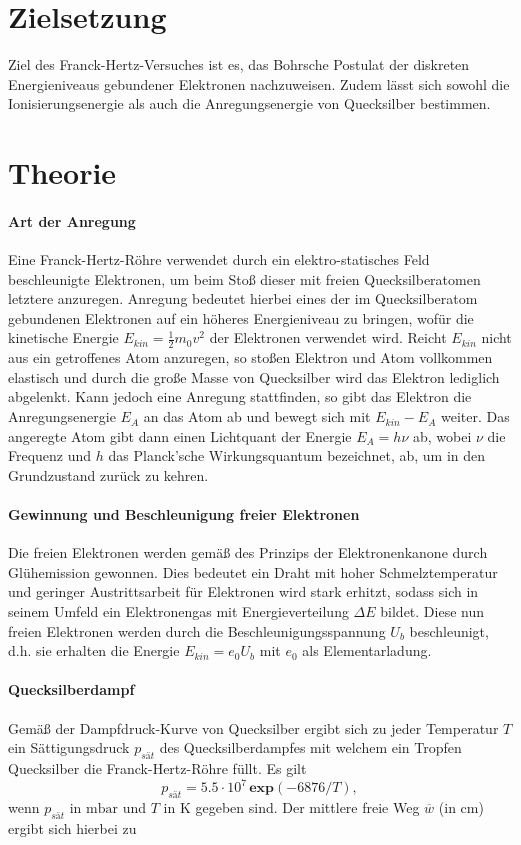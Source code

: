 \section{Zielsetzung}
\label{sec:Ziel}
Ziel des Franck-Hertz-Versuches ist es, das Bohrsche Postulat der diskreten Energieniveaus gebundener Elektronen nachzuweisen.
Zudem lässt sich sowohl die Ionisierungsenergie als auch die Anregungsenergie von Quecksilber bestimmen.

\section{Theorie}
\label{sec:Theorie}

\paragraph{Art der Anregung}
Eine Franck-Hertz-Röhre verwendet durch ein elektro-statisches Feld beschleunigte Elektronen, um beim Stoß dieser mit freien Quecksilberatomen letztere anzuregen. Anregung bedeutet hierbei eines der im Quecksilberatom gebundenen Elektronen auf ein höheres Energieniveau zu bringen, wofür die kinetische Energie $E_{kin} = \frac{1}{2} m_0 v^2$ der Elektronen verwendet wird. Reicht $E_{kin}$ nicht aus ein getroffenes Atom anzuregen, so stoßen Elektron und Atom vollkommen elastisch und durch die große Masse von Quecksilber wird das Elektron lediglich abgelenkt. Kann jedoch eine Anregung stattfinden, so gibt das Elektron die Anregungsenergie $E_A$ an das Atom ab und bewegt sich mit $E_{kin} - E_A$ weiter. Das angeregte Atom gibt dann einen Lichtquant der Energie $E_A=h \nu$ ab, wobei $\nu$ die Frequenz und $h$ das Planck'sche Wirkungsquantum bezeichnet, ab, um in den Grundzustand zurück zu kehren.

\paragraph{Gewinnung und Beschleunigung freier Elektronen}
Die freien Elektronen werden gemäß des Prinzips der Elektronenkanone durch Glühemission gewonnen. Dies bedeutet ein Draht mit hoher Schmelztemperatur und geringer Austrittsarbeit für Elektronen wird stark erhitzt, sodass sich in seinem Umfeld ein Elektronengas mit Energieverteilung $\Delta E$ bildet. Diese nun freien Elektronen werden durch die Beschleunigungsspannung $U_b$ beschleunigt, d.h. sie erhalten die Energie $E_{kin} = e_0 U_b$ mit $e_0$ als Elementarladung.

\paragraph{Quecksilberdampf}
Gemäß der Dampfdruck-Kurve von Quecksilber ergibt sich zu jeder Temperatur $T$ ein Sättigungsdruck $p_{sät}$ des Quecksilberdampfes mit welchem ein Tropfen Quecksilber die Franck-Hertz-Röhre füllt.
Es gilt
\begin{equation}
  \label{eqn:p}
  p_{sät} = 5.5\cdot10^7 \, \textbf{exp} \left( -6876/T \right),
\end{equation}
wenn $p_{sät}$ in $\si{\milli \bar}$ und $T$ in $\si{\kelvin}$ gegeben sind.
Der mittlere freie Weg $\overline{w}$ (in $\si{\centi \meter}$) ergibt sich hierbei zu

